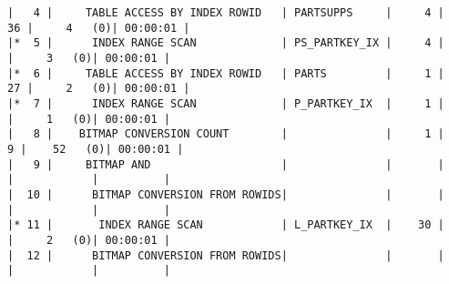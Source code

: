 \documentclass[11pt,a4paper,parskip=half]{scrartcl}
\begin{document}
\begin{lstlisting}
|   4 |     TABLE ACCESS BY INDEX ROWID   | PARTSUPPS     |     4 |    36 |     4   (0)| 00:00:01 |                                                                                                                                                                                                          
|*  5 |      INDEX RANGE SCAN             | PS_PARTKEY_IX |     4 |       |     3   (0)| 00:00:01 |                                                                                                                                                                                                          
|*  6 |     TABLE ACCESS BY INDEX ROWID   | PARTS         |     1 |    27 |     2   (0)| 00:00:01 |                                                                                                                                                                                                          
|*  7 |      INDEX RANGE SCAN             | P_PARTKEY_IX  |     1 |       |     1   (0)| 00:00:01 |                                                                                                                                                                                                          
|   8 |    BITMAP CONVERSION COUNT        |               |     1 |     9 |    52   (0)| 00:00:01 |                                                                                                                                                                                                          
|   9 |     BITMAP AND                    |               |       |       |            |          |                                                                                                                                                                                                          
|  10 |      BITMAP CONVERSION FROM ROWIDS|               |       |       |            |          |                                                                                                                                                                                                          
|* 11 |       INDEX RANGE SCAN            | L_PARTKEY_IX  |    30 |       |     2   (0)| 00:00:01 |                                                                                                                                                                                                          
|  12 |      BITMAP CONVERSION FROM ROWIDS|               |       |       |            |          |                                                                                                                                                                                                          

\end{lstlisting}
\end{document}
